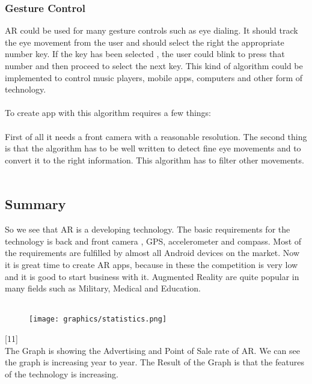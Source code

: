  \subsubsection{Gesture Control}
 AR could be used for many gesture controls such as eye dialing.   It should track the eye movement from the user and should select the right the appropriate number key. If the key has been selected , the user could blink to press that number and then proceed to select the next key. This kind of algorithm could be implemented to control music players, mobile apps, computers and other form of technology.\cite{AugmentedBook}
 \\
 \\
 To create app with this algorithm requires a few things:
 \\
 \\
 First of all it needs a front camera with a reasonable resolution. The second thing is that the algorithm has to be well written to detect fine eye movements  and to convert it to the right information. This algorithm has to filter other movements.
 \\
 \\
 \subsection{Summary}
 So we see that AR is a developing technology. The basic requirements for the technology is back and front camera , GPS, accelerometer and compass. Most of the requirements are fulfilled by almost all Android devices on the market. Now it is great time to create AR apps, because in these the competition is very low and it is good to start business with it. Augmented Reality are quite popular in many fields such as Military, Medical and Education.
 \\
 \\
 \begin{figure}[H]
 \centering
 \texttt{[image: graphics/statistics.png]}
 \caption{\cite{statistics}}
 \end{figure}
 [11]
 \\
 The Graph is showing the Advertising and Point of Sale rate of AR. We can see the graph is increasing year to year. The Result of the Graph is that the features of the technology is increasing.
